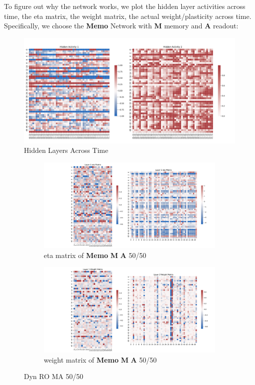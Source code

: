 \documentclass{article}
\begin{document}
To figure out why the network works, we plot the hidden layer activities across time, the eta matrix, the weight matrix, the actual weight/plasticity across time. Specifically, we choose the \textbf{Memo} Network with \textbf{M} memory and \textbf{A} readout:

\begin{figure}[h!]
\includegraphics[width=1\textwidth]{HL_Combined}
\caption{Hidden Layers Across Time}
\end{figure}

\begin{figure}[h!]
  \centering
  \begin{subfigure}[b]{0.45\textwidth}
    \includegraphics[width=\textwidth]{Eta_Matrices}
    \caption{eta matrix of \textbf{Memo} \textbf{M} \textbf{A} 50/50}
  \end{subfigure}
  \hfill
  \begin{subfigure}[b]{0.45\textwidth}
    \includegraphics[width=\textwidth]{Weight_Matrices}
    \caption{weight matrix of \textbf{Memo} \textbf{M} \textbf{A} 50/50}
  \end{subfigure}
  \caption{Dyn RO MA 50/50}
\end{figure}
\end{document}
